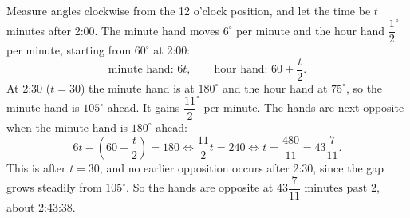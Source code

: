 Measure angles clockwise from the 12 o'clock position, and let the time be $t$ minutes after 2:00. The minute hand moves $6^\circ$ per minute and the hour hand $\dfrac{1}{2}^\circ$ per minute, starting from $60^\circ$ at 2:00:
\[
\text{minute hand: }6t,\qquad\text{hour hand: }60+\dfrac {t}{2} .
\]
At 2:30 ($t=30$) the minute hand is at $180^\circ$ and the hour hand at $75^\circ$, so the minute hand is $105^\circ$ ahead. It gains $\dfrac{11}{2}^\circ$ per minute. The hands are next opposite when the minute hand is $180^\circ$ ahead:
\[
6t-\left(60+\dfrac {t}{2}\right)=180\iff\dfrac{11}{2}t=240\iff t=\dfrac{480}{11}=43\dfrac{7}{11}.
\]
This is after $t=30$, and no earlier opposition occurs after 2:30, since the gap grows steadily from $105^\circ$. So the hands are opposite at $\boxed{43\dfrac{7}{11}\text{ minutes past }2}$, about 2:43:38.
